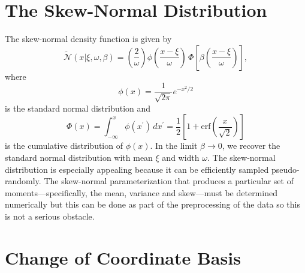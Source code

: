 \documentclass[preprint]{aastex}
\newcommand{\eqlabel}[1]{\label{eq:#1}}
\begin{document}

\appendix

\section{The Skew-Normal Distribution}
\label{sect:sn}


The skew-normal density function is given by
\citep{OHagan:1976a,Azzalini:1996}
\begin{equation}
    \eqlabel{sn}
    \tilde{\mathcal{N}} (x | \xi, \omega, \beta) =
        \left ( \frac{2}{\omega} \right )
        \phi \left ( \frac{x-\xi}{\omega} \right )
        \, \Phi \left [ \beta \left ( \frac{x-\xi}{\omega} \right ) \right ],
\end{equation}
where
\begin{equation}
    \phi (x) = \frac{1}{\sqrt{2\pi}} e^{-x^2/2}
\end{equation}
is the standard normal distribution and
\begin{equation}
    \Phi(x) = \int _{-\infty} ^x \phi(x^\prime) \, dx^\prime
        = \frac{1}{2} \left [ 1 +
            \mathrm{erf} \left ( \frac{x}{\sqrt{2}} \right )\right ]
\end{equation}
is the cumulative distribution of $\phi(x)$.  In the limit $\beta \to 0$,
we recover the standard normal distribution with mean $\xi$ and width
$\omega$.  The skew-normal distribution is especially appealing because it
can be efficiently sampled pseudo-randomly. The skew-normal parameterization
that produces a particular set of moments---specifically, the mean, variance
and skew---must be determined numerically but this can be done as part of
the preprocessing of the data so this is not a serious obstacle.


\section{Change of Coordinate Basis}

\label{sect:coords}
\end{document}
